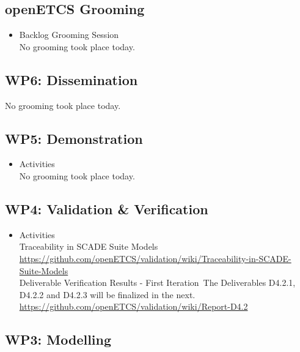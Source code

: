 \documentclass[a4paper, 11pt]{article}
\begin{document}
\subsection{openETCS Grooming}
\begin{itemize}
\item Backlog Grooming Session\\
No grooming took place today.

\end{itemize}

\subsection{WP6: Dissemination}
No grooming took place today.


\subsection{WP5: Demonstration}
\begin{itemize}
\item Activities\\
No grooming took place today.

\end{itemize}

\subsection{WP4: Validation \& Verification}
\begin{itemize}
\item Activities\\
Traceability in SCADE Suite Models\\
\url{https://github.com/openETCS/validation/wiki/Traceability-in-SCADE-Suite-Models}\\
Deliverable Verification Results - First Iteration\ 
The Deliverables D4.2.1, D4.2.2 and D4.2.3 will be finalized in the next. \\
\url{https://github.com/openETCS/validation/wiki/Report-D4.2}\\
\end{itemize}

\subsection{WP3: Modelling}
\end{document}
